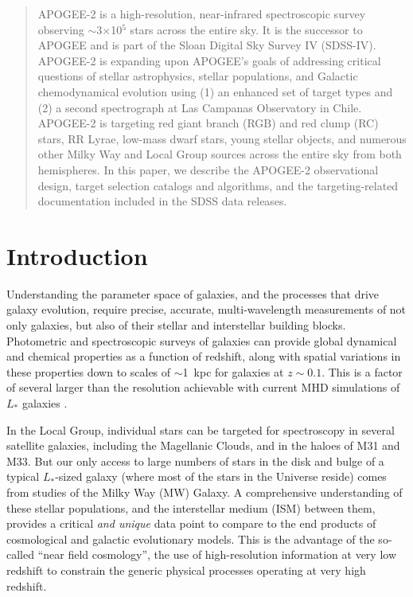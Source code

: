 \documentclass[12pt,twocolumn]{emulateapj}
\begin{document}
\begin{abstract}
APOGEE-2 is a high-resolution, near-infrared spectroscopic survey observing $\sim$3$\times$10$^5$ stars across the entire sky.  It is the successor to APOGEE and is part of the Sloan Digital Sky Survey IV (SDSS-IV).  APOGEE-2 is expanding upon APOGEE's goals of addressing critical questions of stellar astrophysics, stellar populations, and Galactic chemodynamical evolution using (1) an enhanced set of target types and (2) a second spectrograph at Las Campanas Observatory in Chile.  APOGEE-2 is targeting red giant branch (RGB) and red clump (RC) stars, RR Lyrae, low-mass dwarf stars, young stellar objects, and numerous other Milky Way and Local Group sources across the entire sky from both hemispheres.  In this paper, we describe the APOGEE-2 observational design, target selection catalogs and algorithms, and the targeting-related documentation included in the SDSS data releases.
\end{abstract}

\keywords{}


\section{Introduction} \label{sec:intro}
\setcounter{footnote}{0}

Understanding the parameter space of galaxies, and the processes that drive galaxy evolution, require precise, accurate, multi-wavelength measurements of not only galaxies, but also of their stellar and interstellar building blocks.  Photometric and spectroscopic surveys of galaxies can provide global dynamical and chemical properties as a function of redshift, along with spatial variations in these properties down to scales of $\sim$1~kpc for galaxies at $z \sim 0.1$.  This is a factor of several larger than the resolution achievable with current MHD simulations of $L_*$ galaxies \citep[$\sim$1--50~pc; e.g.,][]{Wetzel_2016_Latte,Hopkins_2017_FIRE2}.

In the Local Group, individual stars can be targeted for spectroscopy in several satellite galaxies, including the Magellanic Clouds, and in the haloes of M31 and M33.  But our only access to large numbers of stars in the disk and bulge of a typical $L_*$-sized galaxy (where most of the stars in the Universe reside) comes from studies of the Milky Way (MW) Galaxy.  A comprehensive understanding of these stellar populations, and the interstellar medium (ISM) between them, provides a critical {\it and unique} data point to compare to the end products of cosmological and galactic evolutionary models.  This is the advantage of the so-called ``near field cosmology'', the use of high-resolution information at very low redshift to constrain the generic physical processes operating at very high redshift.
\end{document}
